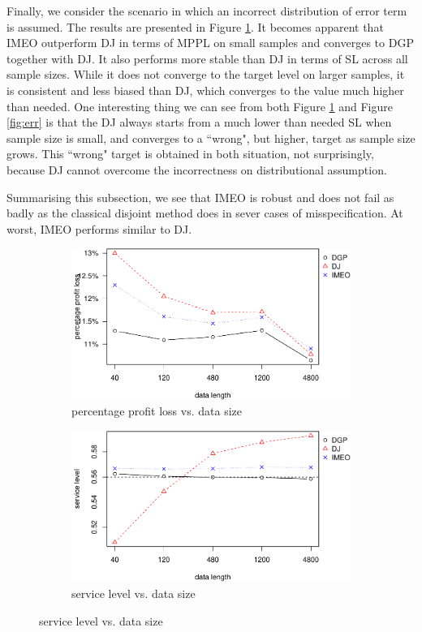 \documentclass[a4paper,11pt]{article}
\begin{document}
Finally, we consider the scenario in which an incorrect distribution of error term is assumed. The results are presented in Figure \ref{fig:err_non}. It becomes apparent that IMEO outperform DJ in terms of MPPL on small samples and converges to DGP together with DJ. It also performs more stable than DJ in terms of SL across all sample sizes. While it does not converge to the target level on larger samples, it is consistent and less biased than DJ, which converges to the value much higher than needed. One interesting thing we can see from both Figure \ref{fig:err_non} and Figure \ref{fig:err} is that the DJ always starts from a much lower than needed SL when sample size is small, and converges to a ``wrong", but higher, target as sample size grows. This ``wrong" target is obtained in both situation, not surprisingly, because DJ cannot overcome the incorrectness on distributional assumption.

Summarising this subsection, we see that IMEO is robust and does not fail as badly as the classical disjoint method does in sever cases of misspecification. At worst, IMEO performs similar to DJ.

\begin{figure}[ht]
\centering
\caption{Performance vs. sample size with Laplace distributed error term, nonlinear model}
\begin{subfigure}[b]{0.48\textwidth}
\centering
\includegraphics[width=\textwidth]{nonlaplaceppl.pdf}
\caption{percentage profit loss vs. data size}
\end{subfigure}
\hfill
\begin{subfigure}[b]{0.48\textwidth}
\centering
\includegraphics[width=\textwidth]{nonlaplacesl.pdf}
\caption{service level vs. data size}
\end{subfigure}
\label{fig:err_non}
\end{figure}
\end{document}
